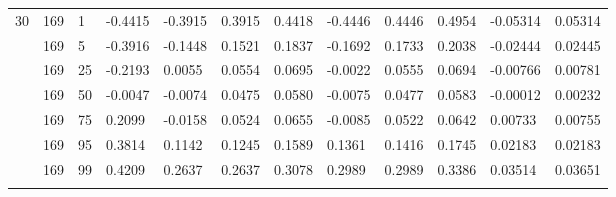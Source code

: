 \begin{longtable}{llllllllllll}
30 & 169 & 1 & -0.4415 & -0.3915 & 0.3915 & 0.4418 & -0.4446 & 0.4446 & 0.4954 & -0.05314 & 0.05314 \\ \addlinespace[3pt]
30 & 169 & 5 & -0.3916 & -0.1448 & 0.1521 & 0.1837 & -0.1692 & 0.1733 & 0.2038 & -0.02444 & 0.02445 \\ \addlinespace[3pt]
30 & 169 & 25 & -0.2193 & 0.0055 & 0.0554 & 0.0695 & -0.0022 & 0.0555 & 0.0694 & -0.00766 & 0.00781 \\ \addlinespace[3pt]
30 & 169 & 50 & -0.0047 & -0.0074 & 0.0475 & 0.0580 & -0.0075 & 0.0477 & 0.0583 & -0.00012 & 0.00232 \\ \addlinespace[3pt]
30 & 169 & 75 & 0.2099 & -0.0158 & 0.0524 & 0.0655 & -0.0085 & 0.0522 & 0.0642 & 0.00733 & 0.00755 \\ \addlinespace[3pt]
30 & 169 & 95 & 0.3814 & 0.1142 & 0.1245 & 0.1589 & 0.1361 & 0.1416 & 0.1745 & 0.02183 & 0.02183 \\ \addlinespace[3pt]
30 & 169 & 99 & 0.4209 & 0.2637 & 0.2637 & 0.3078 & 0.2989 & 0.2989 & 0.3386 & 0.03514 & 0.03651 \\ \addlinespace[3pt]
\bottomrule\end{longtable}
